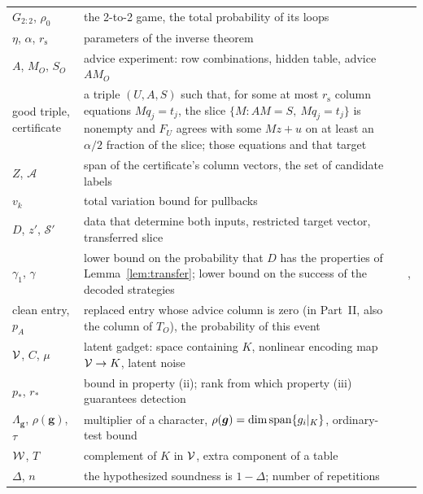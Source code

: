 {\begin{longtable}{@{}p{3.4cm}p{10.4cm}r@{}}
$G_{2:2}$, $\rho_0$ & the 2-to-2 game, the total probability of its loops & \pageref{def:G22}\\
$\eta$, $\alpha$, $r_{\mathrm s}$ & parameters of the inverse theorem & \pageref{thm:inverse}\\
$A$, $M_O$, $S_O$ & advice experiment: row combinations, hidden table, advice $AM_O$ & \pageref{def:advice}\\
good triple, certificate & a triple $(U,A,S)$ such that, for some at most $r_{\mathrm s}$ column equations $Mq_j=t_j$, the slice $\{M:AM=S,\ Mq_j=t_j\}$ is nonempty and $F_U$ agrees with some $Mz+u$ on at least an $\alpha/2$ fraction of the slice; those equations and that target & \pageref{nt:good}\\
$Z$, $\mathcal A$ & span of the certificate's column vectors, the set of candidate labels & \pageref{lem:labelset}\\
$v_k$ & total variation bound for pullbacks & \pageref{lem:tv}\\
$D$, $z'$, $\mathcal S'$ & data that determine both inputs, restricted target vector, transferred slice & \pageref{nt:transfer}\\
$\gamma_1$, $\gamma$ & lower bound on the probability that $D$ has the properties of Lemma~\ref{lem:transfer}; lower bound on the success of the decoded strategies & \pageref{lem:transfer}, \pageref{prop:decoding}\\
clean entry, $p_A$ & replaced entry whose advice column is zero (in Part~II, also the column of $T_O$), the probability of this event & \pageref{nt:clean}\\
$\mathcal{V}$, $C$, $\mu$ & latent gadget: space containing $K$, nonlinear encoding map $\mathcal{V}\to K$, latent noise & \pageref{lem:latent}\\
$p_*$, $r_*$ & bound in property (ii); rank from which property (iii) guarantees detection & \pageref{lem:latent}\\
$\Lambda_{\boldsymbol g}$, $\rho(\boldsymbol g)$, $\tau$ & multiplier of a character, $\rho(\boldsymbol g)=\dim\operatorname{span}\{g_i|_K\}$, ordinary-test bound & \pageref{nt:comparison}\\
$\mathcal{W}$, $T$ & complement of $K$ in $\mathcal{V}$, extra component of a table & \pageref{nt:comparison}\\
$\Delta$, $n$ & the hypothesized soundness is $1-\Delta$; number of repetitions & \pageref{prop:fixedgap}\\
\end{longtable}
}
